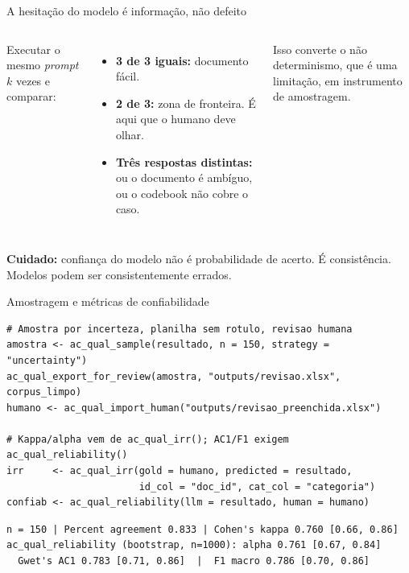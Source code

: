 \documentclass[11pt,aspectratio=169]{beamer}
\begin{document}
\begin{frame}{A hesitação do modelo é informação, não defeito}
\begin{columns}[T]
\small
Executar o mesmo \emph{prompt} $k$ vezes e comparar:
\begin{itemize}
  \item \textbf{3 de 3 iguais:} documento fácil.
  \item \textbf{2 de 3:} zona de fronteira. É aqui que o humano deve olhar.
  \item \textbf{Três respostas distintas:} ou o documento é ambíguo, ou o
        codebook não cobre o caso.
\end{itemize}
\vspace{0.15cm}
Isso converte o não determinismo, que é uma limitação, em instrumento de
amostragem.
\centering
{}
\end{columns}
\vspace{0.2cm}
\footnotesize \textbf{Cuidado:} confiança do modelo não é probabilidade de
acerto. É consistência. Modelos podem ser consistentemente errados.
\end{frame}

\begin{frame}[fragile]{Amostragem e métricas de confiabilidade}
\begin{lstlisting}
# Amostra por incerteza, planilha sem rotulo, revisao humana
amostra <- ac_qual_sample(resultado, n = 150, strategy = "uncertainty")
ac_qual_export_for_review(amostra, "outputs/revisao.xlsx", corpus_limpo)
humano <- ac_qual_import_human("outputs/revisao_preenchida.xlsx")

# Kappa/alpha vem de ac_qual_irr(); AC1/F1 exigem ac_qual_reliability()
irr     <- ac_qual_irr(gold = humano, predicted = resultado,
                       id_col = "doc_id", cat_col = "categoria")
confiab <- ac_qual_reliability(llm = resultado, human = humano)
\end{lstlisting}
\begin{lstlisting}[style=Rsaida]
n = 150 | Percent agreement 0.833 | Cohen's kappa 0.760 [0.66, 0.86]
ac_qual_reliability (bootstrap, n=1000): alpha 0.761 [0.67, 0.84]
  Gwet's AC1 0.783 [0.71, 0.86]  |  F1 macro 0.786 [0.70, 0.86]
\end{lstlisting}
\end{frame}
\end{document}
